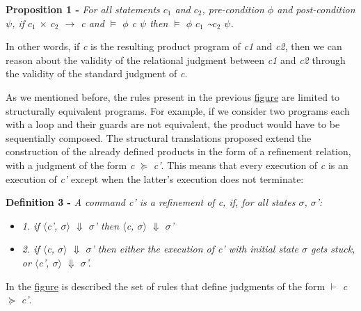 \textbf{Proposition 1 -}  \emph{For all statements $c_1$ and $c_2$, pre-condition $\phi$ and post-condition $\psi$, if $c_1$ $\times$ $c_2$ $\rightarrow$ c and $\vDash$ {$\phi$} c {$\psi$} then $\vDash$ {$\phi$} $c_1$ \textasciitilde $c_2$ {$\psi$}.}

\bigskip
In other words, if \emph{c} is the resulting product program of \emph{c1} and \emph{c2}, then we can reason about the validity of the relational judgment between \emph{c1} and \emph{c2} through the validity of the standard judgment of \emph{c}.

As we mentioned before, the rules present in the previous \hyperref[fig:product_construction_equal_struct]{figure} are limited to structurally equivalent programs.
For example, if we consider two programs each with a loop and their guards are not equivalent, the product would have to be sequentially composed.
The structural translations proposed extend the construction of the already defined products in the form of a refinement relation, with a judgment of the form \emph{c} $\succcurlyeq$ \emph{c'}. 
This means that every execution of \emph{c} is an execution of \emph{c'} except when the latter's execution does not terminate:
\bigskip

\textbf{Definition 3 -}  \emph{A command c' is a refinement of c, if, for all states $\sigma$, $\sigma$':}    
\begin{itemize}
  \item{\emph{1. if $\langle$c', $\sigma$$\rangle$ $\Downarrow$ $\sigma$' then $\langle$c, $\sigma$$\rangle$ $\Downarrow$ $\sigma$'}}
  \vspace{-10pt}
  \item{\emph{2. if $\langle$c, $\sigma$$\rangle$ $\Downarrow$ $\sigma$' then either the execution of c' with initial state $\sigma$ gets stuck, or $\langle$c', $\sigma$$\rangle$ $\Downarrow$ $\sigma$'.}}
\end{itemize}

\bigskip
In the \hyperref[fig:product_construction_reduction]{figure} is described the set of rules that define judgments of the form $\vdash$ \emph{c} $\succcurlyeq$ \emph{c'}.

